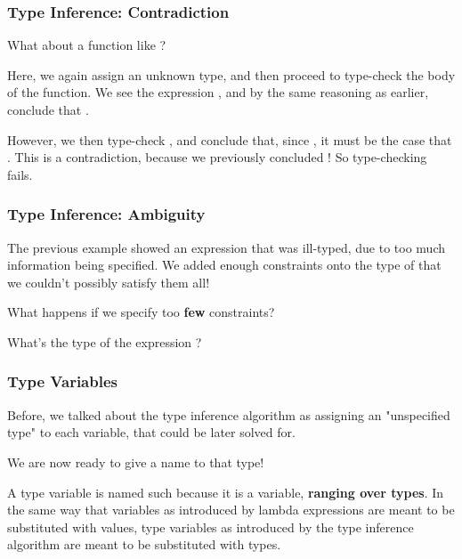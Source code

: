 \documentclass[aspectratio=169, handout]{beamer}
\begin{document}
\begin{frame}[fragile]
  \frametitle{Type Inference: Contradiction}

  What about a function like ?

  \pause
  \vspace{\fill}

  Here, we again assign  an unknown type, and then proceed
  to type-check the body of the function. We see the expression 
  , and by the same reasoning as earlier, conclude that
  .

  \pause
  \vspace{\fill}

  However, we then type-check , and conclude that,
  since , it must be the case
  that . This is a contradiction, because we 
  previously concluded ! So type-checking fails.
\end{frame}

\begin{frame}[fragile]
  \frametitle{Type Inference: Ambiguity}

  The previous example showed an expression that was ill-typed, 
  due to too much information being specified. We added enough 
  constraints onto the type of  that we couldn't possibly
  satisfy them all!
  
  \pause
  \vspace{\fill}

  What happens if we specify too \textbf{few} constraints?

  \pause
  \vspace{\fill}

  What's the type of the expression ?
\end{frame}


\begin{frame}[fragile]
  \frametitle{Type Variables}

  Before, we talked about the type inference algorithm as assigning an
  "unspecified type" to each variable, that could be later solved for.

  \pause
  \vspace{\fill}

  We are now ready to give a name to that type!

  \pause
  \vspace{\fill}


  \pause
  \vspace{\fill}

  A type variable is named such because it is a variable, \textbf{ranging
  over types}. In the same way that variables as introduced by lambda expressions
  are meant to be substituted with values, type variables as introduced by
  the type inference algorithm are meant to be substituted with types.
\end{frame}
\end{document}
